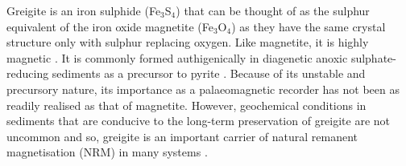 Greigite is an iron sulphide (Fe$_3$S$_4$) that can be thought of as the sulphur equivalent of the iron oxide magnetite (Fe$_3$O$_4$) as they have the same crystal structure only with sulphur replacing oxygen. Like magnetite, it is highly magnetic \citep{Li2014}. It is commonly formed authigenically in diagenetic anoxic sulphate-reducing sediments \citep{Roberts2011} as a precursor to pyrite \citep{Berner1984,Hunger2007}. Because of its unstable and precursory nature, its importance as a palaeomagnetic recorder has not been as readily realised as that of magnetite. However, geochemical conditions in sediments that are conducive to the long-term preservation of greigite are not uncommon \citep{Roberts2011,Roberts2015} and so, greigite is an important carrier of natural remanent magnetisation (NRM) in many systems \citep{Ron2007}.\par

